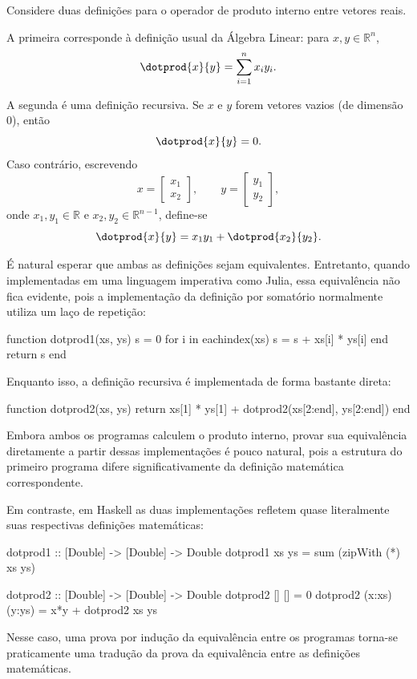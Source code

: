 
Considere duas definições para o operador de produto interno entre vetores reais.

A primeira corresponde à definição usual da Álgebra Linear: para $x, y \in \mathbb{R}^n$,
\[
  \dotprod{x}{y}
  =
  \sum_{i=1}^{n} x_i y_i.
\]

A segunda é uma definição recursiva. Se $x$ e $y$ forem vetores vazios (de dimensão $0$), então
\[
  \dotprod{x}{y} = 0.
\]
Caso contrário, escrevendo
\[
  x
  =
  \begin{bmatrix}
    x_1 \\
    x_2
  \end{bmatrix},
  \qquad
  y
  =
  \begin{bmatrix}
    y_1 \\
    y_2
  \end{bmatrix},
\]
onde $x_1, y_1 \in \mathbb{R}$ e $x_2, y_2 \in \mathbb{R}^{n-1}$, define-se
\[
  \dotprod{x}{y}
  =
  x_1 y_1 + \dotprod{x_2}{y_2}.
\]

É natural esperar que ambas as definições sejam equivalentes. Entretanto, quando implementadas em uma linguagem imperativa como Julia, essa equivalência não fica evidente, pois a implementação da definição por somatório normalmente utiliza um laço de repetição:

\begin{code}
function dotprod1(xs, ys)
    s = 0
    for i in eachindex(xs)
        s = s + xs[i] * ys[i]
    end
    return s
end
\end{code}

Enquanto isso, a definição recursiva é implementada de forma bastante direta:

\begin{code}
function dotprod2(xs, ys)
    return xs[1] * ys[1] + dotprod2(xs[2:end], ys[2:end])
end
\end{code}

Embora ambos os programas calculem o produto interno, provar sua equivalência diretamente a partir dessas implementações é pouco natural, pois a estrutura do primeiro programa difere significativamente da definição matemática correspondente.

Em contraste, em Haskell as duas implementações refletem quase literalmente suas respectivas definições matemáticas:

\begin{code}
dotprod1 :: [Double] -> [Double] -> Double
dotprod1 xs ys = sum (zipWith (*) xs ys)
\end{code}

\begin{code}
dotprod2 :: [Double] -> [Double] -> Double
dotprod2 [] [] = 0
dotprod2 (x:xs) (y:ys) = x*y + dotprod2 xs ys
\end{code}

Nesse caso, uma prova por indução da equivalência entre os programas torna-se praticamente uma tradução da prova da equivalência entre as definições matemáticas.
